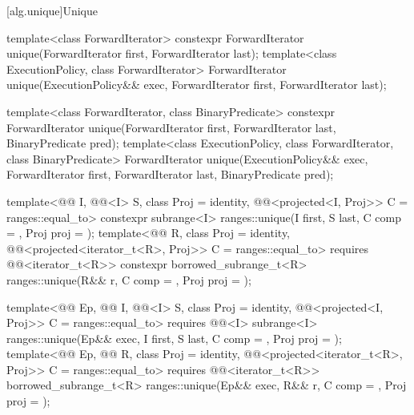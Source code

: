 [alg.unique]{Unique}

%
\begin{itemdecl}
template<class ForwardIterator>
  constexpr ForwardIterator unique(ForwardIterator first, ForwardIterator last);
template<class ExecutionPolicy, class ForwardIterator>
  ForwardIterator unique(ExecutionPolicy&& exec,
                         ForwardIterator first, ForwardIterator last);

template<class ForwardIterator, class BinaryPredicate>
  constexpr ForwardIterator unique(ForwardIterator first, ForwardIterator last,
                                   BinaryPredicate pred);
template<class ExecutionPolicy, class ForwardIterator, class BinaryPredicate>
  ForwardIterator unique(ExecutionPolicy&& exec,
                         ForwardIterator first, ForwardIterator last,
                         BinaryPredicate pred);

template<@@ I, @@<I> S, class Proj = identity,
         @@<projected<I, Proj>> C = ranges::equal_to>
  constexpr subrange<I> ranges::unique(I first, S last, C comp = {}, Proj proj = {});
template<@@ R, class Proj = identity,
         @@<projected<iterator_t<R>, Proj>> C = ranges::equal_to>
  requires @@<iterator_t<R>>
  constexpr borrowed_subrange_t<R>
    ranges::unique(R&& r, C comp = {}, Proj proj = {});

template<@@ Ep, @@ I, @@<I> S,
         class Proj = identity,
         @@<projected<I, Proj>> C = ranges::equal_to>
  requires @@<I>
  subrange<I> ranges::unique(Ep&& exec, I first, S last, C comp = {}, Proj proj = {});
template<@@ Ep, @@ R, class Proj = identity,
         @@<projected<iterator_t<R>, Proj>> C = ranges::equal_to>
  requires @@<iterator_t<R>>
  borrowed_subrange_t<R> ranges::unique(Ep&& exec, R&& r, C comp = {}, Proj proj = {});
\end{itemdecl}


